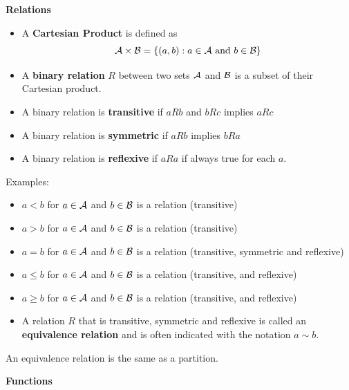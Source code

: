 \documentclass[justified, sixbynine]{tufte-book}
\def\subsubsection#1{{\bf #1}}
\theoremstyle{plain}%
\newtheorem * {corollary}{Corollary}
\theoremstyle{definition}
\theoremstyle{remark}
\newtheorem * {remark}{Remark}
\newtheorem * {note}{Note}
\begin{document}
\begin{fullwidth}
\subsubsection{Relations}

\begin{itemize}
\item  A {\bf Cartesian Product} is defined as
\begin{equation}
{\cal A}\times {\cal B}=\{(a, b):a\in {\cal A}\text{ and }b\in {\cal B}\}
\end{equation}

\item  A {\bf binary relation} $R$ between two sets ${\cal A}$ and ${\cal B}$
is a subset of their Cartesian product.

\item  A binary relation is {\bf transitive} if $aRb$ and $bRc$ implies $aRc$

\item  A binary relation is {\bf symmetric} if $aRb$ implies $bRa$

\item  A binary relation is {\bf reflexive} if $aRa$ if always true for each
$a.$
\end{itemize}

Examples:

\begin{itemize}
\item
$a<b$ for $a\in {\cal A}$ and $b\in {\cal B}$ is a relation (transitive)
\item
$a>b$ for $a\in {\cal A}$ and $b\in {\cal B}$ is a relation (transitive)
\item
$a=b$ for $a\in {\cal A}$ and $b\in {\cal B}$ is a relation (transitive, 
symmetric and reflexive)
\item
$a\leq b$ for $a\in {\cal A}$ and $b\in {\cal B}$ is a relation (transitive, 
and reflexive)
\item
$a\geq b$ for $a\in {\cal A}$ and $b\in {\cal B}$ is a relation (transitive, 
and reflexive)
\item  A relation $R$ that is transitive, symmetric and reflexive is called
an {\bf equivalence relation} and is often indicated with the notation $a\sim b$.
\end{itemize}

An equivalence relation is the same as a partition.

\subsubsection{Functions}


\end{fullwidth}
\end{document}
